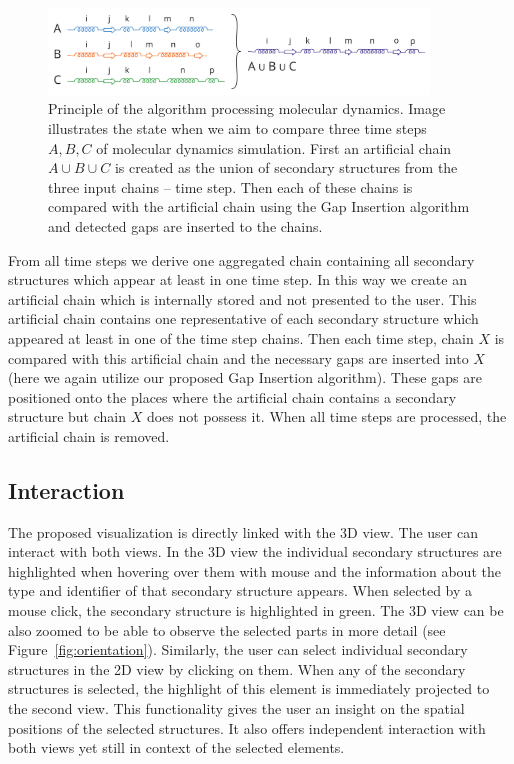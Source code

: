 \documentclass[twocolumn]{bmcart}%
\begin{document}
\begin{figure}[hbt]
  \centering
  \includegraphics[width=0.9\textwidth]{pics/second.pdf}
  \caption{Principle of the algorithm processing molecular dynamics. Image illustrates the state when we aim to compare three time steps $A, B, C$ of molecular dynamics simulation. First an artificial chain $A \cup B \cup C$ is created as the union of secondary structures from the three input chains -- time step. Then each of these chains is compared with the artificial chain using the Gap Insertion algorithm and detected gaps are inserted to the chains.}
  \label{fig:alg2}
\end{figure}

From all time steps we derive one aggregated chain containing all secondary structures which appear at least in one time step. 
In this way we create an artificial chain which is internally stored and not presented to the user.
This artificial chain contains one representative of each secondary structure which appeared at least in one of the time step chains.
Then each time step, chain $X$ is compared with this artificial chain and the necessary gaps are inserted into $X$ (here we again utilize our proposed Gap Insertion algorithm).
These gaps are positioned onto the places where the artificial chain contains a secondary structure but chain $X$ does not possess it. 
When all time steps are processed, the artificial chain is removed.


\subsection*{Interaction}
The proposed visualization is directly linked with the 3D view.
The user can interact with both views.
In the 3D view the individual secondary structures are highlighted when hovering over them with mouse and the information about the type and identifier of that secondary structure appears.
When selected by a mouse click, the secondary structure is highlighted in green.
The 3D view can be also zoomed to be able to observe the selected parts in more detail (see Figure~\ref{fig:orientation}).
Similarly, the user can select individual secondary structures in the 2D view by clicking on them.
When any of the secondary structures is selected, the highlight of this element is immediately projected to the second view.
This functionality gives the user an insight on the spatial positions of the selected structures.
It also offers independent interaction with both views yet still in context of the selected elements.
\end{document}
